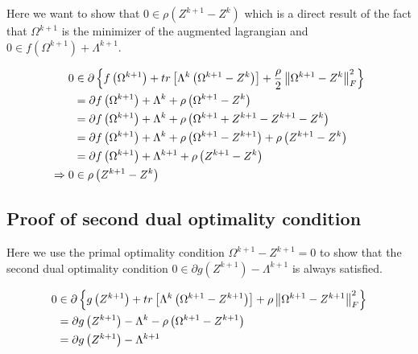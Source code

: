 \documentclass[11pt,]{report}
\theoremstyle{definition}
\theoremstyle{definition}
\theoremstyle{definition}
\theoremstyle{remark}
\begin{document}
Here we want to show that \(0 \in \rho\left(Z^{k + 1} - Z^{k}\right)\) which is a direct result of the fact that \(\Omega^{k + 1}\) is the minimizer of the augmented lagrangian and \(0 \in f\left(\Omega^{k + 1}\right) + \Lambda^{k + 1}\).

\begin{equation}
\begin{split}
  0 &\in \partial \left\{ f\left(\Omega^{k + 1}\right) + tr\left[ \Lambda^{k}\left( \Omega^{k + 1} - Z^{k} \right) \right] + \frac{\rho}{2}\left\| \Omega^{k + 1} - Z^{k} \right\|_{F}^{2} \right\} \\
  &= \partial f\left(\Omega^{k + 1}\right) + \Lambda^{k} + \rho\left(\Omega^{k + 1} - Z^{k}\right) \\
  &= \partial f\left(\Omega^{k + 1}\right) + \Lambda^{k} + \rho\left(\Omega^{k + 1} + Z^{k + 1} - Z^{k + 1} - Z^{k}\right) \\
  &= \partial f\left(\Omega^{k + 1}\right) + \Lambda^{k} + \rho\left(\Omega^{k + 1} - Z^{k + 1}\right) + \rho\left(Z^{k + 1} - Z^{k}\right) \\
  &= \partial f\left(\Omega^{k + 1}\right) + \Lambda^{k + 1} + \rho\left(Z^{k + 1} - Z^{k}\right) \\
  \Rightarrow 0 &\in \rho\left( Z^{k + 1} - Z^{k} \right)
\end{split}
\label{eq:appendixdualresidual}\notag
\end{equation}

\hypertarget{proofdualopt}{%
\subsection{Proof of second dual optimality condition}\label{proofdualopt}}

Here we use the primal optimality condition \(\Omega^{k + 1} - Z^{k + 1} = 0\) to show that the second dual optimality condition \(0 \in \partial g\left(Z^{k + 1}\right) - \Lambda^{k + 1}\) is always satisfied.

\begin{equation}
\begin{split}
  0 &\in \partial \left\{ g\left(Z^{k + 1}\right) + tr\left[ \Lambda^{k}\left( \Omega^{k + 1} - Z^{k + 1} \right) \right] + \rho\left\| \Omega^{k + 1} - Z^{k + 1} \right\|_{F}^{2} \right\} \\
  &= \partial g\left(Z^{k + 1}\right) - \Lambda^{k} - \rho\left(\Omega^{k + 1} - Z^{k + 1}\right) \\
  &= \partial g\left(Z^{k + 1}\right) - \Lambda^{k + 1} \\
\end{split}
\label{eq:appendixdualopt}\notag
\end{equation}
\end{document}
